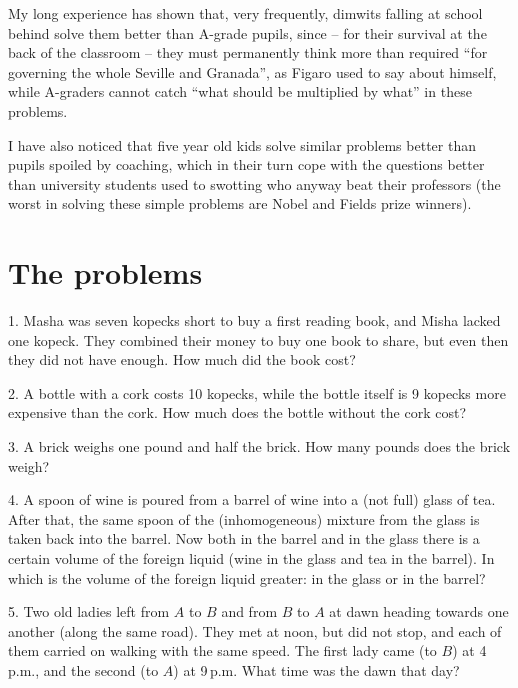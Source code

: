 My long experience has shown that, very frequently, dimwits falling at school behind solve them better
than A-grade pupils, since -- for their survival at the back of the classroom -- they must permanently
think more than required \enquote{for governing the whole Seville and Granada}, as Figaro used to say about
himself, while A-graders cannot catch \enquote{what should be multiplied by what} in these problems.

I have also noticed that five year old kids solve similar problems better than pupils spoiled
by coaching, which in their turn cope with the questions better than university students used
to swotting who anyway beat their professors (the worst in solving these simple problems are
Nobel and Fields prize winners).   

\clearpage
\section*{The problems}

\begin{problem}{1.}
	Masha was seven kopecks short to buy a first reading book, and Misha lacked one kopeck.
	They combined their money to buy one book to share, but even then they did not have enough.
	How much did the book cost?
\end{problem}

\begin{problem}{2.}
	A bottle with a cork costs 10 kopecks, while the bottle itself is 9 kopecks more expensive
	than the cork. How much does the bottle without the cork cost?
\end{problem}

\begin{problem}{3.}
	A brick weighs one pound and half the brick. How many pounds does the brick weigh?
\end{problem}

\begin{problem}{4.}
	A spoon of wine is poured from a barrel of wine into a (not full) glass of tea.
	After that, the same spoon of the (inhomogeneous) mixture from the glass is taken back into the barrel.
	Now both in the barrel and in the glass there is a certain volume of the foreign liquid (wine in the glass and
	tea in the barrel). In which is the volume of the foreign liquid greater: in the glass or in the barrel?
\end{problem}

\begin{problem}{5.}
	Two old ladies left from $A$ to $B$ and from $B$ to $A$ at dawn
	heading towards one another (along the same road). They met at noon,
	but did not stop, and each of them carried on walking with the same speed.
	The first lady came (to $B$) at 4\,p.m., and the second (to $A$) at 9\,p.m. What time was the dawn that day? 
\end{problem}

